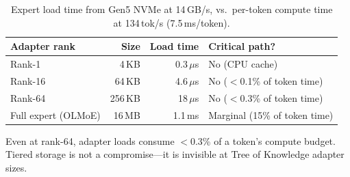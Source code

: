 \documentclass{article}
\newcommand{\tok}{Tree of Knowledge}
\begin{document}
\begin{table}[h]
\centering
\caption{Expert load time from Gen5 NVMe at 14\,GB/s, vs.\ per-token compute
time at 134\,tok/s (7.5\,ms/token).}
\label{tab:load-times}
\begin{tabular}{@{}lrrl@{}}
\toprule
Adapter rank & Size & Load time & Critical path? \\
\midrule
Rank-1 & 4\,KB & 0.3\,$\mu$s & No (CPU cache) \\
Rank-16 & 64\,KB & 4.6\,$\mu$s & No ($<$0.1\% of token time) \\
Rank-64 & 256\,KB & 18\,$\mu$s & No ($<$0.3\% of token time) \\
Full expert (OLMoE) & 16\,MB & 1.1\,ms & Marginal (15\% of token time) \\
\bottomrule
\end{tabular}
\end{table}

Even at rank-64, adapter loads consume $<$0.3\% of a token's compute budget.
Tiered storage is not a compromise---it is invisible at \tok{} adapter sizes.
\end{document}
